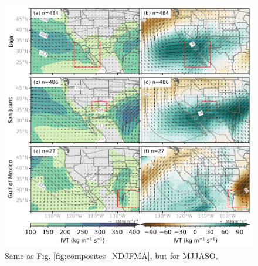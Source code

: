 \documentclass[draft]{agujournal2019}
\begin{document}
\begin{figure}
\noindent\includegraphics[width=\textwidth, height=\textheight, keepaspectratio]{fig6.png}
\caption{Same as Fig. \ref{fig:composites_NDJFMA}, but for MJJASO.}
\label{fig:composites_MJJASO}
\end{figure}
\end{document}

